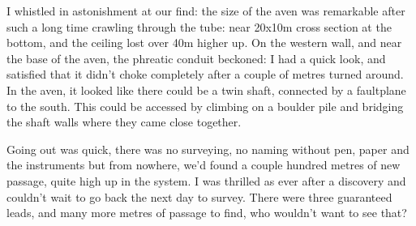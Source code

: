 I whistled in astonishment at our find: the size of the aven was remarkable after such a long time crawling through the tube: near 20x10m cross section at the bottom, and the ceiling lost over 40m higher up. On the western wall, and near the base of the aven, the phreatic conduit beckoned: I had a quick look, and satisfied that it didn’t choke completely after a couple of metres turned around. In the aven, it looked like there could be a twin shaft, connected by a faultplane to the south. This could be accessed by climbing on a boulder pile and bridging the shaft walls where they came close together.

Going out was quick, there was no surveying, no naming without pen, paper and the instruments but from nowhere, we’d found a couple hundred metres of new passage, quite high up in the system. I was thrilled as ever after a discovery and couldn’t wait to go back the next day to survey. There were three guaranteed leads, and many more metres of passage to find, who wouldn’t want to see that?

